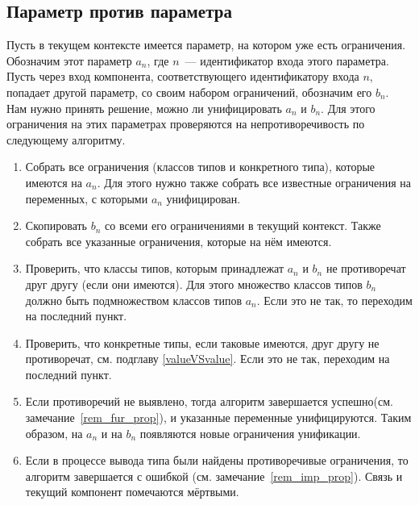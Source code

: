 \subsection{Параметр против параметра}\label{algo}
Пусть в текущем контексте имеется параметр, на котором уже есть ограничения. Обозначим этот параметр $a_n$, где $n$~--- идентификатор входа этого параметра. Пусть через вход компонента, соответствующего идентификатору входа $n$, попадает другой параметр, со своим набором ограничений, обозначим его $b_n$. Нам нужно принять решение, можно ли унифицировать $a_n$ и $b_n$. Для этого ограничения на этих параметрах проверяются на непротиворечивость по следующему алгоритму.
\begin{enumerate}
	\item Собрать все ограничения (классов типов и конкретного типа), которые имеются на $a_n$. Для этого нужно также собрать все известные ограничения на переменных, с которыми $a_n$ унифицирован.
	\item Скопировать $b_n$ со всеми его ограничениями в текущий контекст. Также собрать все указанные ограничения, которые на нём имеются.
	\item Проверить, что классы типов, которым принадлежат $a_n$ и $b_n$ не противоречат друг другу (если они имеются). Для этого множество классов типов $b_n$ должно быть подмножеством классов типов $a_n$. Если это не так, то переходим на последний пункт.
	\item Проверить, что конкретные типы, если таковые имеются, друг другу не противоречат, см. подглаву \ref{valueVSvalue}. Если это не так, переходим на последний пункт.
	\item Если противоречий не выявлено, тогда алгоритм завершается успешно(см. замечание~\ref{rem_fur_prop}), и указанные переменные унифицируются. Таким образом, на $a_n$ и на $b_n$ появляются новые ограничения унификации.
	\item Если в процессе вывода типа были найдены противоречивые ограничения, то алгоритм завершается с ошибкой (см. замечание~\ref{rem_imp_prop}). Связь и текущий компонент помечаются мёртвыми.	
\end{enumerate}

\label{rem_fur_prop}
\label{rem_imp_prop}

